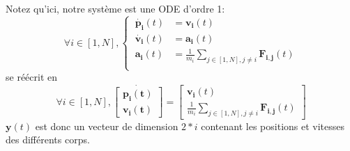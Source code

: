 \documentclass{article}
\newcommand{\myvec}[1]{\ensuremath{\mathbf{#1}}}
\begin{document}
\noindent Notez qu'ici, notre système est une ODE d'ordre 1:
\begin{equation*}
    \forall i \in [1,N], \left\{\begin{aligned}
        \ \myvec{\dot{p_i}}(t) & = \myvec{v_i}(t) \\
        \ \myvec{\dot{v_i}}(t) & = \myvec{a_i}(t) \\
        \ \myvec{a_i}(t) & = \frac{1}{m_i} \sum_{j \in [1,N], j \ne i} \myvec{F_{i,j}}(t) \\
    \end{aligned}\right.
\end{equation*}
se réécrit en
\begin{equation*}
    \forall i \in [1,N], \myvec{\dot{\left[\begin{aligned}
        \myvec{p_i}(t) \\ \myvec{v_i}(t)
    \end{aligned}\right]}} =
    \left[\begin{gathered}
    \myvec{v_i}(t) \\ \frac{1}{m_i} \sum_{j \in [1,N], j \ne i} \myvec{F_{i,j}}(t)
    \end{gathered}\right]
\end{equation*}
$\myvec{y}(t)$ est donc un vecteur de dimension $2 * i$ contenant les positions et vitesses des différents corps.

\vspace{1em}
\end{document}
